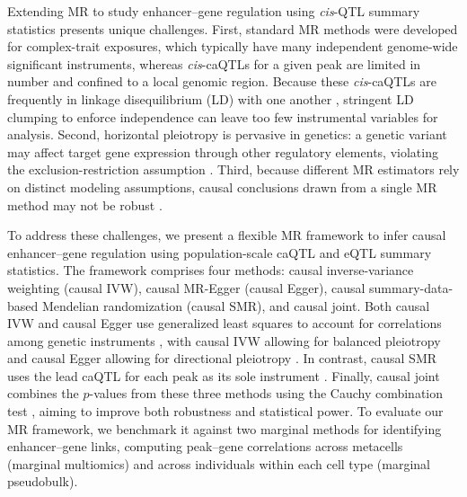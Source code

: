 \noindent Extending MR to study enhancer--gene regulation using \textit{cis}-QTL summary statistics presents unique challenges. First, standard MR methods were developed for complex-trait exposures, which typically have many independent genome-wide significant instruments, whereas \textit{cis}-caQTLs for a given peak are limited in number and confined to a local genomic region. Because these \textit{cis}-caQTLs are frequently in linkage disequilibrium (LD) with one another \cite{kang2026fusiomr,lin2024cismrcml}, stringent LD clumping to enforce independence can leave too few instrumental variables for analysis. Second, horizontal pleiotropy is pervasive in genetics: a genetic variant may affect target gene expression through other regulatory elements, violating the exclusion-restriction assumption \cite{bowden2015egger,kang2026fusiomr}. Third, because different MR estimators rely on distinct modeling assumptions, causal conclusions drawn from a single MR method may not be robust \cite{burgess2017interpreting}.

\noindent To address these challenges, we present a flexible MR framework to infer causal enhancer--gene regulation using population-scale caQTL and eQTL summary statistics. The framework comprises four methods: causal inverse-variance weighting (causal IVW), causal MR-Egger (causal Egger), causal summary-data-based Mendelian randomization (causal SMR), and causal joint. Both causal IVW and causal Egger use generalized least squares to account for correlations among genetic instruments \cite{burgess2016combining,burgess2017interpreting}, with causal IVW allowing for balanced pleiotropy and causal Egger allowing for directional pleiotropy \cite{burgess2017interpreting}. In contrast, causal SMR uses the lead caQTL for each peak as its sole instrument \cite{zhu2016smr}. Finally, causal joint combines the $p$-values from these three methods using the Cauchy combination test \cite{liu2020cauchy}, aiming to improve both robustness and statistical power. To evaluate our MR framework, we benchmark it against two marginal methods for identifying enhancer--gene links, computing peak--gene correlations across metacells (marginal multiomics) and across individuals within each cell type (marginal pseudobulk).

